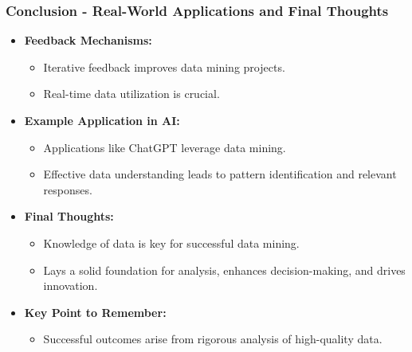 \documentclass[aspectratio=169]{beamer}
\begin{document}
\begin{frame}[fragile]
    \frametitle{Conclusion - Real-World Applications and Final Thoughts}
    \begin{itemize}
        \item \textbf{Feedback Mechanisms:}
        \begin{itemize}
            \item Iterative feedback improves data mining projects.
            \item Real-time data utilization is crucial.
        \end{itemize}

        \item \textbf{Example Application in AI:}
        \begin{itemize}
            \item Applications like ChatGPT leverage data mining.
            \item Effective data understanding leads to pattern identification and relevant responses.
        \end{itemize}

        \item \textbf{Final Thoughts:}
        \begin{itemize}
            \item Knowledge of data is key for successful data mining.
            \item Lays a solid foundation for analysis, enhances decision-making, and drives innovation.
        \end{itemize}
        
        \item \textbf{Key Point to Remember:}
        \begin{itemize}
            \item Successful outcomes arise from rigorous analysis of high-quality data.
        \end{itemize}
    \end{itemize}
\end{frame}
\end{document}
